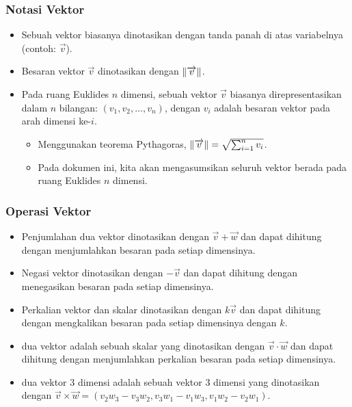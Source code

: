 \begin{frame}
\frametitle{Notasi Vektor}
\begin{itemize}
  \item Sebuah vektor biasanya dinotasikan dengan tanda panah di atas variabelnya (contoh: $\overrightarrow{v}$).
  \item Besaran vektor $\overrightarrow{v}$ dinotasikan dengan $\left\lVert\overrightarrow{v}\right\rVert$.
  \item Pada ruang Euklides $n$ dimensi, sebuah vektor $\overrightarrow{v}$ biasanya direpresentasikan dalam $n$ bilangan: $(v_1, v_2, \dots, v_n)$, dengan $v_i$ adalah besaran vektor pada arah dimensi ke-$i$.
  \begin{itemize}
    \item Menggunakan teorema Pythagoras, $\left\lVert\overrightarrow{v}\right\rVert = \sqrt{\sum_{i=1}^{n} v_i}$.
    \item Pada dokumen ini, kita akan mengasumsikan seluruh vektor berada pada ruang Euklides $n$ dimensi.
  \end{itemize}
\end{itemize}
\end{frame}

\begin{frame}
\frametitle{Operasi Vektor}
\begin{itemize}
  \item Penjumlahan dua vektor dinotasikan dengan $\overrightarrow{v} + \overrightarrow{w}$ dan dapat dihitung dengan menjumlahkan besaran pada setiap dimensinya.
  \item Negasi vektor dinotasikan dengan $-\overrightarrow{v}$ dan dapat dihitung dengan menegasikan besaran pada setiap dimensinya.
  \item Perkalian vektor dan skalar dinotasikan dengan $k\overrightarrow{v}$ dan dapat dihitung dengan mengkalikan besaran pada setiap dimensinya dengan $k$.
  \item {} dua vektor adalah sebuah skalar yang dinotasikan dengan $\overrightarrow{v} \cdot \overrightarrow{w}$ dan dapat dihitung dengan menjumlahkan perkalian besaran pada setiap dimensinya.
  \item {} dua vektor $3$ dimensi adalah sebuah vektor $3$ dimensi yang dinotasikan dengan $\overrightarrow{v} \times \overrightarrow{w} = (v_2w_3 - v_3w_2, v_3w_1 - v_1w_3, v_1w_2 - v_2w_1)$.
\end{itemize}
\end{frame}

